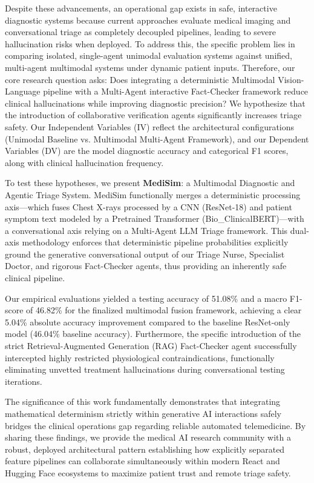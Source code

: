 \documentclass[11pt,a4paper]{article}
\begin{document}
Despite these advancements, an operational gap exists in safe, interactive diagnostic systems because current approaches evaluate medical imaging and conversational triage as completely decoupled pipelines, leading to severe hallucination risks when deployed. To address this, the specific problem lies in comparing isolated, single-agent unimodal evaluation systems against unified, multi-agent multimodal systems under dynamic patient inputs. Therefore, our core research question asks: Does integrating a deterministic Multimodal Vision-Language pipeline with a Multi-Agent interactive Fact-Checker framework reduce clinical hallucinations while improving diagnostic precision? We hypothesize that the introduction of collaborative verification agents significantly increases triage safety. Our Independent Variables (IV) reflect the architectural configurations (Unimodal Baseline vs. Multimodal Multi-Agent Framework), and our Dependent Variables (DV) are the model diagnostic accuracy and categorical F1 scores, along with clinical hallucination frequency.

To test these hypotheses, we present \textbf{MediSim}: a Multimodal Diagnostic and Agentic Triage System. MediSim functionally merges a deterministic processing axis—which fuses Chest X-rays processed by a CNN (ResNet-18) and patient symptom text modeled by a Pretrained Transformer (Bio\_ClinicalBERT)—with a conversational axis relying on a Multi-Agent LLM Triage framework. This dual-axis methodology enforces that deterministic pipeline probabilities explicitly ground the generative conversational output of our Triage Nurse, Specialist Doctor, and rigorous Fact-Checker agents, thus providing an inherently safe clinical pipeline.

Our empirical evaluations yielded a testing accuracy of 51.08\% and a macro F1-score of 46.82\% for the finalized multimodal fusion framework, achieving a clear 5.04\% absolute accuracy improvement compared to the baseline ResNet-only model (46.04\% baseline accuracy). Furthermore, the specific introduction of the strict Retrieval-Augmented Generation (RAG) Fact-Checker agent successfully intercepted highly restricted physiological contraindications, functionally eliminating unvetted treatment hallucinations during conversational testing iterations.

The significance of this work fundamentally demonstrates that integrating mathematical determinism strictly within generative AI interactions safely bridges the clinical operations gap regarding reliable automated telemedicine. By sharing these findings, we provide the medical AI research community with a robust, deployed architectural pattern establishing how explicitly separated feature pipelines can collaborate simultaneously within modern React and Hugging Face ecosystems to maximize patient trust and remote triage safety.
\end{document}
